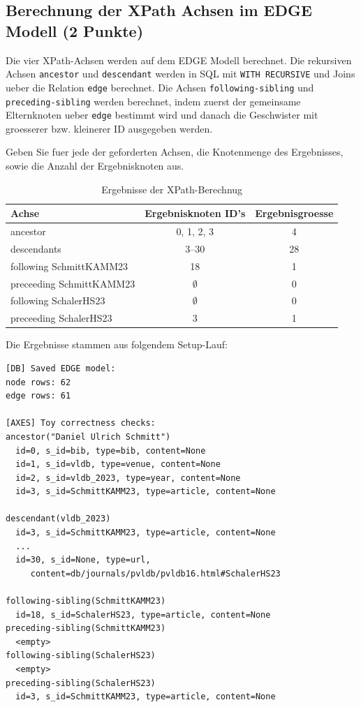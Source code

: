 \documentclass[11pt]{scrartcl}
\begin{document}
\subsection*{Berechnung der XPath Achsen im EDGE Modell (2 Punkte)}

Die vier XPath-Achsen werden auf dem EDGE Modell berechnet. Die rekursiven Achsen \texttt{ancestor} und \texttt{descendant} werden in SQL mit \texttt{WITH RECURSIVE} und Joins ueber die Relation \texttt{edge} berechnet. Die Achsen \texttt{following-sibling} und \texttt{preceding-sibling} werden berechnet, indem zuerst der gemeinsame Elternknoten ueber \texttt{edge} bestimmt wird und danach die Geschwister mit groesserer bzw. kleinerer ID ausgegeben werden.

Geben Sie fuer jede der geforderten Achsen, die Knotenmenge des Ergebnisses, sowie die Anzahl der Ergebnisknoten aus.

\begin{table}[h]
	\centering
		\begin{center}
			\begin{tabular}{ l | c c }
				\toprule
				Achse & Ergebnisknoten ID's & Ergebnisgroesse\\
				\midrule
				ancestor & 0, 1, 2, 3 & 4 \\
				descendants & 3--30 & 28 \\
				following SchmittKAMM23 & 18 & 1 \\
				preceeding SchmittKAMM23 & $\emptyset$ & 0 \\
				following SchalerHS23 & $\emptyset$ & 0 \\
				preceeding SchalerHS23 & 3 & 1 \\
				\bottomrule
			\end{tabular}
			\end{center}
	\caption{Ergebnisse der XPath-Berechnug}
	\label{tab:ErgebnisseDerXPathBerechnug}
\end{table}

Die Ergebnisse stammen aus folgendem Setup-Lauf:

\begin{lstlisting}
[DB] Saved EDGE model:
node rows: 62
edge rows: 61

[AXES] Toy correctness checks:
ancestor("Daniel Ulrich Schmitt")
  id=0, s_id=bib, type=bib, content=None
  id=1, s_id=vldb, type=venue, content=None
  id=2, s_id=vldb_2023, type=year, content=None
  id=3, s_id=SchmittKAMM23, type=article, content=None

descendant(vldb_2023)
  id=3, s_id=SchmittKAMM23, type=article, content=None
  ...
  id=30, s_id=None, type=url,
     content=db/journals/pvldb/pvldb16.html#SchalerHS23

following-sibling(SchmittKAMM23)
  id=18, s_id=SchalerHS23, type=article, content=None
preceding-sibling(SchmittKAMM23)
  <empty>
following-sibling(SchalerHS23)
  <empty>
preceding-sibling(SchalerHS23)
  id=3, s_id=SchmittKAMM23, type=article, content=None
\end{lstlisting}
\end{document}
